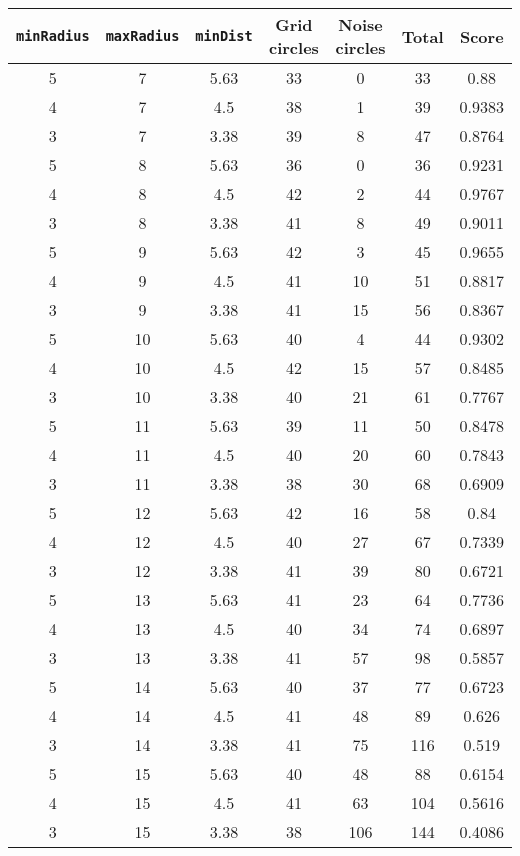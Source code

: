 \documentclass[letterpaper, 12pt]{article}
\begin{document}
\begin{longtable}{|c|c|c|c|c|c|c|}
\hline
\textbf{\texttt{minRadius}} & \textbf{\texttt{maxRadius}} & \textbf{\texttt{minDist}} & \textbf{Grid circles} & \textbf{Noise circles} & \textbf{Total} & \textbf{Score} \\
\hline
5 & 7 & 5.63 & 33 & 0 & 33 & 0.88 \\
\hline
4 & 7 & 4.5 & 38 & 1 & 39 & 0.9383 \\
\hline
3 & 7 & 3.38 & 39 & 8 & 47 & 0.8764 \\
\hline
5 & 8 & 5.63 & 36 & 0 & 36 & 0.9231 \\
\hline
4 & 8 & 4.5 & 42 & 2 & 44 & 0.9767 \\
\hline
3 & 8 & 3.38 & 41 & 8 & 49 & 0.9011 \\
\hline
5 & 9 & 5.63 & 42 & 3 & 45 & 0.9655 \\
\hline
4 & 9 & 4.5 & 41 & 10 & 51 & 0.8817 \\
\hline
3 & 9 & 3.38 & 41 & 15 & 56 & 0.8367 \\
\hline
5 & 10 & 5.63 & 40 & 4 & 44 & 0.9302 \\
\hline
4 & 10 & 4.5 & 42 & 15 & 57 & 0.8485 \\
\hline
3 & 10 & 3.38 & 40 & 21 & 61 & 0.7767 \\
\hline
5 & 11 & 5.63 & 39 & 11 & 50 & 0.8478 \\
\hline
4 & 11 & 4.5 & 40 & 20 & 60 & 0.7843 \\
\hline
3 & 11 & 3.38 & 38 & 30 & 68 & 0.6909 \\
\hline
5 & 12 & 5.63 & 42 & 16 & 58 & 0.84 \\
\hline
4 & 12 & 4.5 & 40 & 27 & 67 & 0.7339 \\
\hline
3 & 12 & 3.38 & 41 & 39 & 80 & 0.6721 \\
\hline
5 & 13 & 5.63 & 41 & 23 & 64 & 0.7736 \\
\hline
4 & 13 & 4.5 & 40 & 34 & 74 & 0.6897 \\
\hline
3 & 13 & 3.38 & 41 & 57 & 98 & 0.5857 \\
\hline
5 & 14 & 5.63 & 40 & 37 & 77 & 0.6723 \\
\hline
4 & 14 & 4.5 & 41 & 48 & 89 & 0.626 \\
\hline
3 & 14 & 3.38 & 41 & 75 & 116 & 0.519 \\
\hline
5 & 15 & 5.63 & 40 & 48 & 88 & 0.6154 \\
\hline
4 & 15 & 4.5 & 41 & 63 & 104 & 0.5616 \\
\hline
3 & 15 & 3.38 & 38 & 106 & 144 & 0.4086 \\

\end{longtable}
\end{document}
